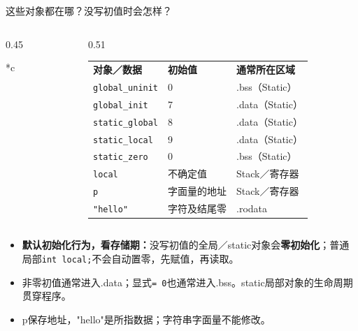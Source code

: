 \begin{frame}{这些对象都在哪？没写初值时会怎样？}
\begin{columns}[T]
\begin{column}{0.45\textwidth}
\begin{Code}*{c}\end{Code}
\end{column}
\begin{column}{0.51\textwidth}
\scriptsize
\setlength{\tabcolsep}{4pt}
\renewcommand{\arraystretch}{1.3}
\begin{tabular}{lll}
\textbf{对象／数据} & \textbf{初始值} & \textbf{通常所在区域}\\
\texttt{global\_uninit} & 0 & .bss（Static）\\
\texttt{global\_init} & 7 & .data（Static）\\
\texttt{static\_global} & 8 & .data（Static）\\
\texttt{static\_local} & 9 & .data（Static）\\
\texttt{static\_zero} & 0 & .bss（Static）\\
\texttt{local} & 不确定值 & Stack／寄存器\\
\texttt{p} & 字面量的地址 & Stack／寄存器\\
\texttt{"hello"} & 字符及结尾零 & .rodata
\end{tabular}
\end{column}
\end{columns}
\medskip
\begin{itemize}
    \item \textbf{默认初始化行为，看存储期：}没写初值的全局／static对象会\textbf{零初始化}；普通局部\texttt{int local;}不会自动置零，\alert{先赋值，再读取}。
    \item 非零初值通常进入.data；显式\texttt{= 0}也通常进入.bss。static局部对象的生命周期贯穿程序。
    \item \alert{p保存地址，"hello"是所指数据；字符串字面量不能修改。}
\end{itemize}
\end{frame}

